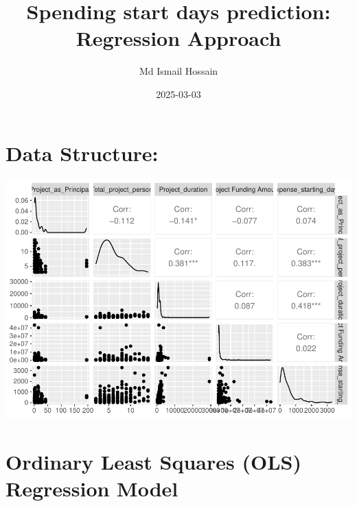 \documentclass[
]{article}
\title{Spending start days prediction: Regression Approach}
\author{Md Ismail Hossain}
\date{2025-03-03}
\begin{document}
\maketitle

\newpage

\section{Data Structure:}\label{data-structure}

\includegraphics{Regression-Approach_files/figure-latex/unnamed-chunk-3-1.pdf}

\section{Ordinary Least Squares (OLS) Regression
Model}\label{ordinary-least-squares-ols-regression-model}
\end{document}
